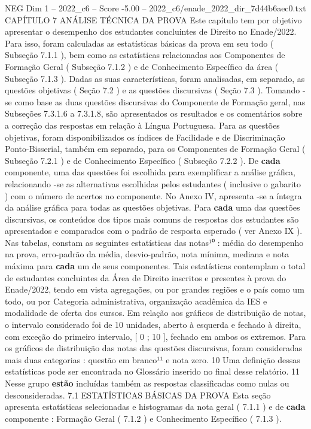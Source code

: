 \begin{textsample}{NEG Dim 1 – 2022\_c6 – Score -5.00 – 2022\_c6/enade\_2022\_dir\_7d44b6aec0.txt}  \label{ex:f1_neg_188}
CAPÍTULO 7 ANÁLISE TÉCNICA DA PROVA Este capítulo tem por objetivo apresentar o desempenho dos estudantes concluintes de Direito no Enade/2022.
Para isso, foram calculadas as estatísticas básicas da prova em seu todo ( Subseção 7.1.1 ), bem como as estatísticas relacionadas aos Componentes de Formação Geral ( Subseção 7.1.2 ) e de Conhecimento Específico da área ( Subseção 7.1.3 ).
Dadas as suas características, foram analisadas, em separado, as questões objetivas ( Seção 7.2 ) e as questões discursivas ( Seção 7.3 ).
Tomando -se como base as duas questões discursivas do Componente de Formação geral, nas Subseções 7.3.1.6 a 7.3.1.8, são apresentados os resultados e os comentários sobre a correção das respostas em relação à Língua Portuguesa.
Para as questões objetivas, foram disponibilizados os índices de Facilidade e de Discriminação Ponto-Bisserial, também em separado, para os Componentes de Formação Geral ( Subseção 7.2.1 ) e de Conhecimento Específico ( Subseção 7.2.2 ).
De \textbf{cada} componente, uma das questões foi escolhida para exemplificar a análise gráfica, relacionando -se as alternativas escolhidas pelos estudantes ( inclusive o gabarito ) com o número de acertos no componente.
No Anexo IV, apresenta -se a íntegra da análise gráfica para todas as questões objetivas.
Para \textbf{cada} uma das questões discursivas, os conteúdos dos tipos mais comuns de respostas dos estudantes são apresentados e comparados com o padrão de resposta esperado ( ver Anexo IX ).
Nas tabelas, constam as seguintes estatísticas das notas¹⁰ : média do desempenho na prova, erro-padrão da média, desvio-padrão, nota mínima, mediana e nota máxima para \textbf{cada} um de seus componentes.
Tais estatísticas contemplam o total de estudantes concluintes da Área de Direito inscritos e presentes à prova do Enade/2022, tendo em vista agregações, ou por grandes regiões e o país como um todo, ou por Categoria administrativa, organização acadêmica da IES e modalidade de oferta dos cursos.
Em relação aos gráficos de distribuição de notas, o intervalo considerado foi de 10 unidades, aberto à esquerda e fechado à direita, com exceção do primeiro intervalo, [ 0 ; 10 ], fechado em ambos os extremos.
Para os gráficos de distribuição das notas das questões discursivas, foram consideradas mais duas categorias : questão em branco¹¹ e nota zero. 10 Uma definição dessas estatísticas pode ser encontrada no Glossário inserido no final desse relatório. 11 Nesse grupo \textbf{estão} incluídas também as respostas classificadas como nulas ou desconsideradas. 7.1 ESTATÍSTICAS BÁSICAS DA PROVA Esta seção apresenta estatísticas selecionadas e histogramas da nota geral ( 7.1.1 ) e de \textbf{cada} componente : Formação Geral ( 7.1.2 ) e Conhecimento Específico ( 7.1.3 ).

\end{textsample}
